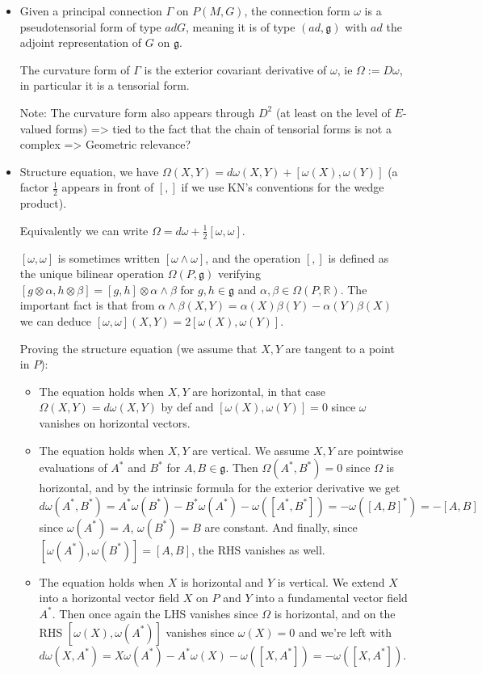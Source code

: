 \documentclass{report}
\theoremstyle{definition}
\begin{document}
\begin{itemize}
    \item Given a principal connection $\Gamma$ on $P(M,G)$, the connection form $\omega$ is a pseudotensorial form of type $adG$, meaning it is of type $(ad,\mathfrak{g})$ with $ad$ the adjoint representation of $G$ on $\mathfrak{g}$.

    The curvature form of $\Gamma$ is the exterior covariant derivative of $\omega$, ie $\Omega:=D\omega$, in particular it is a tensorial form.

    Note: The curvature form also appears through $D^2$ (at least on the level of $E$-valued forms) => tied to the fact that the chain of tensorial forms is not a complex => Geometric relevance?
    \item Structure equation, we have $\Omega(X,Y)=d\omega(X,Y)+[\omega(X),\omega(Y)]$ (a factor $\frac 12$ appears in front of $[,]$ if we use KN's conventions for the wedge product).

    Equivalently we can write $\Omega=d\omega+\frac 12 [\omega,\omega]$.

    $[\omega,\omega]$ is sometimes written $[\omega\wedge\omega]$, and the operation $[,]$ is defined as the unique bilinear operation $\Omega(P,\mathfrak{g})$ verifying $[g\otimes\alpha,h\otimes\beta]=[g,h]\otimes\alpha\wedge\beta$ for $g,h\in\mathfrak{g}$ and $\alpha,\beta\in\Omega(P,\mathbb{R})$. The important fact is that from $\alpha\wedge\beta(X,Y)=\alpha(X)\beta(Y)-\alpha(Y)\beta(X)$ we can deduce $[\omega,\omega](X,Y)=2[\omega(X),\omega(Y)]$.

    Proving the structure equation (we assume that $X,Y$ are tangent to a point in $P$):
    \begin{itemize}
        \item The equation holds when $X,Y$ are horizontal, in that case $\Omega(X,Y)=d\omega(X,Y)$ by def and $[\omega(X),\omega(Y)]=0$ since $\omega$ vanishes on horizontal vectors.
        \item The equation holds when $X,Y$ are vertical. We assume $X,Y$ are pointwise evaluations of $A^*$ and $B^*$ for $A,B\in\mathfrak{g}$. Then $\Omega(A^*,B^*)=0$ since $\Omega$ is horizontal, and by the intrinsic formula for the exterior derivative we get $d\omega(A^*,B^*)=A^*\omega(B^*)-B^*\omega(A^*)-\omega([A^*,B^*])=-\omega([A,B]^*)=-[A,B]$ since $\omega(A^*)=A$, $\omega(B^*)=B$ are constant. And finally, since $[\omega(A^*),\omega(B^*)]=[A,B]$, the RHS vanishes as well.
        \item The equation holds when $X$ is horizontal and $Y$ is vertical. We extend $X$ into a horizontal vector field $X$ on $P$ and $Y$ into a fundamental vector field $A^*$. Then once again the LHS vanishes since $\Omega$ is horizontal, and on the RHS $[\omega(X),\omega(A^*)]$ vanishes since $\omega(X)=0$ and we're left with $d\omega(X,A^*)=X\omega(A^*)-A^*\omega(X)-\omega([X,A^*])=-\omega([X,A^*])$.


\end{itemize}
\end{itemize}
\end{document}

